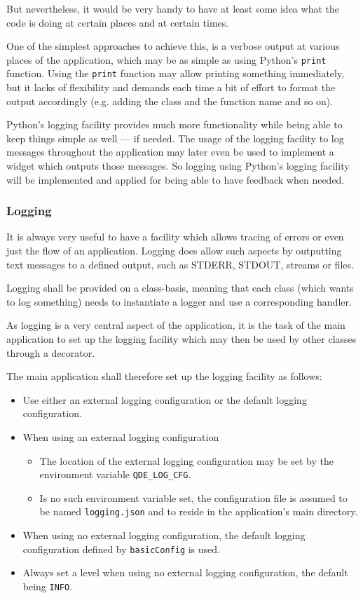 \documentclass[
    a4paper,      %
    10pt,         %
    openright,    %
    notitlepage,  %
    parskip=half, %
]{scrreprt}       %
\theoremstyle{definition}                    %
\begin{document}
But nevertheless, it would be very handy to have at least some idea what the
code is doing at certain places and at certain times.

One of the simplest approaches to achieve this, is a verbose output at various
places of the application, which may be as simple as using Python's
\verb+print+ function. Using the \verb+print+ function may allow
printing something immediately, but it lacks of flexibility and demands each
time a bit of effort to format the output accordingly (e.g. adding the class and
the function name and so on).

Python's logging facility provides much more functionality while being able to
keep things simple as well --- if needed. The usage of the logging facility to
log messages throughout the application may later even be used to implement a
widget which outputs those messages. So logging using Python's logging facility
will be implemented and applied for being able to have feedback when needed.

\subsubsection{Logging}
\label{ssubsec:logging}

It is always very useful to have a facility which allows tracing of errors or
even just the flow of an application. Logging does allow such aspects by
outputting text messages to a defined output, such as STDERR, STDOUT, streams or
files.

Logging shall be provided on a class-basis, meaning that each class (which wants
to log something) needs to instantiate a logger and use a corresponding handler.

As logging is a very central aspect of the application, it is the task of the
main application to set up the logging facility which may then be used by other
classes through a decorator.

The main application shall therefore set up the logging facility as follows:
\begin{itemize}
  \item Use either an external logging configuration or the default logging
        configuration.
  \item When using an external logging configuration
    \begin{itemize}
      \item The location of the external logging configuration may be set by the
            environment variable \verb+QDE_LOG_CFG+.
      \item Is no such environment variable set, the configuration file is
            assumed to be named \verb+logging.json+ and to reside in the
            application's main directory.
    \end{itemize}
  \item When using no external logging configuration, the default logging
        configuration defined by \verb+basicConfig+ is used.
  \item Always set a level when using no external logging configuration, the
        default being \verb+INFO+.
\end{itemize}
\end{document}
